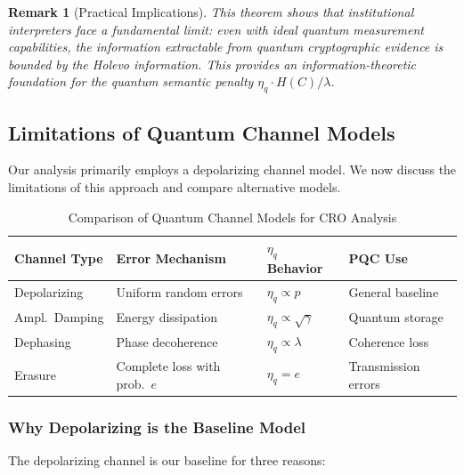 \documentclass{ieeeaccess}
\newtheorem{remark}{Remark}[section]
\begin{document}
\begin{remark}[Practical Implications]
This theorem shows that institutional interpreters face a fundamental limit: even with ideal quantum measurement capabilities, the information extractable from quantum cryptographic evidence is bounded by the Holevo information. This provides an information-theoretic foundation for the quantum semantic penalty $\eta_q \cdot H(C)/\lambda$.
\end{remark}

\subsection{Limitations of Quantum Channel Models}

Our analysis primarily employs a depolarizing channel model. We now discuss the limitations of this approach and compare alternative models.

\begin{table}[t]
\centering
\caption{Comparison of Quantum Channel Models for CRO Analysis}
\label{tab:channel_comparison}
\small
\setlength{\tabcolsep}{4pt}
\begin{tabular}{p{1.8cm}p{2.0cm}p{1.6cm}p{1.5cm}}
\toprule
\textbf{Channel Type} & \textbf{Error Mechanism} & \textbf{$\eta_q$ Behavior} & \textbf{PQC Use} \\
\midrule
Depolarizing      & Uniform random errors                  & $\eta_q \propto p$           & General baseline    \\
Ampl.\ Damping    & Energy dissipation                     & $\eta_q \propto \sqrt{\gamma}$ & Quantum storage   \\
Dephasing         & Phase decoherence                      & $\eta_q \propto \lambda$     & Coherence loss      \\
Erasure           & Complete loss with prob.\ $e$          & $\eta_q = e$                 & Transmission errors \\
\bottomrule
\end{tabular}
\end{table}

\subsubsection{Why Depolarizing is the Baseline Model}

The depolarizing channel is our baseline for three reasons:
\end{document}
